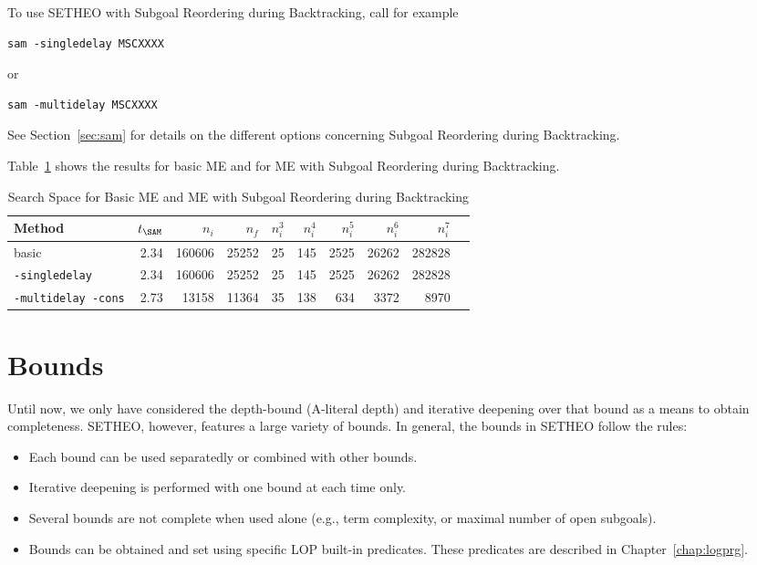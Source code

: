 To use SETHEO with Subgoal Reordering during Backtracking, call for
example 
\begin{center}
\begin{verbatim}
sam -singledelay MSCXXXX
\end{verbatim}
\end{center}
or 
\begin{center}
\begin{verbatim}
sam -multidelay MSCXXXX
\end{verbatim}
\end{center}
See Section~\ref{sec:sam} for details on the different options
concerning Subgoal Reordering during Backtracking.

Table~\ref{tab:tut2:results.delay} shows the results for basic
ME and for ME with Subgoal Reordering during Backtracking.

\begin{table}[htb]
\begin{center}
\begin{tabular}{|l|r|r|r||r|r|r|r|r|r|}
\hline
Method & $t_{\SAM}$ & $n_i$ & $n_f$ & 
	$n_i^3$ & $n_i^4$ & $n_i^5$ & $n_i^6$ & $n_i^7$ \\
\hline\hline
basic & 2.34 & 160606 & 25252 &
	25 & 145 & 2525 & 26262 & 282828 \\
\hline
{\tt -singledelay} & 2.34 & 160606 & 25252 &
	25 & 145 & 2525 & 26262 & 282828 \\
\hline
{\tt -multidelay -cons} & 2.73 & 13158 & 11364 &
	35 & 138 & 634 & 3372 & 8970 \\
\hline\hline
\end{tabular}
\end{center}
\caption{Search Space for Basic ME and ME with Subgoal Reordering
	during Backtracking}  
\label{tab:tut2:results.delay}
\end{table}


\section{Bounds}
\label{sec:tut2:bounds}

Until now, we only have considered the depth-bound (A-literal depth)
and iterative deepening over that bound as a means to obtain completeness.
SETHEO, however, features a large variety of bounds.
In general, the bounds in SETHEO follow the rules:
\begin{itemize}
\item
Each bound can be used separatedly or combined with other bounds.
\item
Iterative deepening is performed with one bound at each time only.
\item
Several bounds are not complete when used alone (e.g., term complexity,
or maximal number of open subgoals).
\item
Bounds can be obtained and set using specific LOP built-in predicates.
These predicates are described in Chapter~\ref{chap:logprg}.
\end{itemize}

